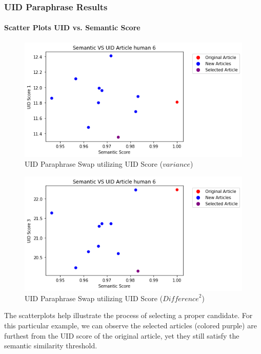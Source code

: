 \documentclass{article}
\begin{document}
\subsubsection{UID Paraphrase Results}
\paragraph{Scatter Plots UID vs. Semantic Score}
\hfill \break

\begin{figure}[H]
    \centering
    \includegraphics[width=1\linewidth]{UID1ParaphraseArticle6.png}
    \caption{UID Paraphrase Swap utilizing UID Score ($variance$)}
    \label{fig:enter-label}
\end{figure}

\begin{figure}[H]
    \centering
    \includegraphics[width=1\linewidth]{UID3ParaphraseArticle6.png}
    \caption{UID Paraphrase Swap utilizing UID Score (${Difference}^2$)}
    \label{fig:enter-label}
\end{figure}

The scatterplots help illustrate the process of selecting a proper candidate. For this particular example, we can observe the selected articles (colored purple) are furthest from the UID score of the original article, yet they still satisfy the semantic similarity threshold.
\end{document}
